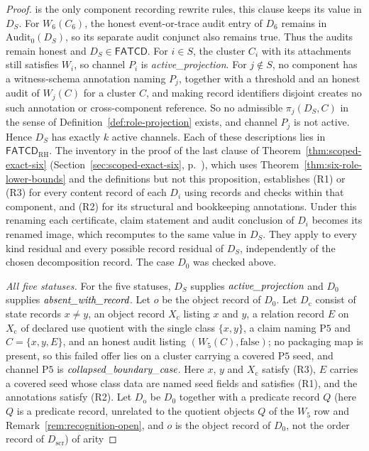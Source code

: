 \documentclass[11pt]{article}
\theoremstyle{definition}
\newcommand{\FATCD}{\ensuremath{\mathsf{FATCD}}}
\newcommand{\activeproj}{\textit{active\_\allowbreak projection}}
\newcommand{\collapsedbc}{\textit{collapsed\_\allowbreak boundary\_\allowbreak case}}
\newcommand{\absentrec}{\textit{absent\_\allowbreak with\_\allowbreak record}}
\newcommand{\Pfive}{\ensuremath{\mathrm{P5}}}
\begin{document}
\begin{proof}
is the only component recording rewrite rules, this clause keeps its value in
\(D_S\). For
\(W_6(C_6)\), the honest event-or-trace audit entry of \(D_6\) remains in
\(\mathrm{Audit}_0(D_S)\), so its separate audit conjunct also remains true.
Thus the audits remain honest and \(D_S\in\FATCD{}\). For \(i\in S\), the cluster \(C_i\)
with its attachments still satisfies \(W_i\), so channel \(P_i\) is
\activeproj{}. For \(j\notin S\), no component has a witness-schema
annotation naming \(P_j\), together with a threshold and an honest audit of
\(W_j(C)\) for a cluster \(C\), and making record identifiers disjoint creates
no such annotation or cross-component reference. So no admissible
\(\pi_j(D_S,C)\) in the sense of Definition~\ref{def:role-projection} exists,
and channel \(P_j\) is not active. Hence \(D_S\) has exactly \(k\) active
channels.
Each of these descriptions lies in \(\FATCD_{\mathrm{RH}}\).
The inventory in the proof of the last clause of
Theorem~\ref{thm:scoped-exact-six} (Section~\ref{sec:scoped-exact-six}, p.~\pageref{thm:scoped-exact-six}), which uses
Theorem~\ref{thm:six-role-lower-bounds} and the definitions but not this
proposition, establishes (R1) or (R3) for every content record of each \(D_i\)
using records and checks within that component, and (R2) for its
structural and bookkeeping annotations. Under this renaming each
certificate, claim statement and audit conclusion of \(D_i\) becomes its renamed
image, which recomputes to the same value in \(D_S\). They apply to every
kind residual and every possible record residual of \(D_S\),
independently of the chosen decomposition record. The case \(D_0\)
was checked above.
\par\emph{All five statuses.} For the five statuses, \(D_S\) supplies \(\activeproj\) and \(D_0\) supplies
\(\absentrec\). Let \(o\) be the object record of \(D_0\). Let \(D_{\mathrm c}\) consist of state
records \(x\ne y\), an object record \(X_{\mathrm c}\) listing \(x\) and \(y\), a
relation record \(E\) on \(X_{\mathrm c}\) of declared use quotient with the
single class \(\{x,y\}\), a claim naming \Pfive{} and \(C=\{x,y,E\}\), and an
honest audit listing \((W_5(C),\mathrm{false})\); no packaging map is present, so
this failed offer lies on a cluster carrying a covered \Pfive{} seed, and channel
\Pfive{} is \(\collapsedbc\). Here \(x\), \(y\) and \(X_{\mathrm c}\) satisfy (R3), \(E\) carries a
covered seed whose class data are named seed fields and satisfies (R1), and the
annotations satisfy (R2). Let \(D_{\mathrm{o}}\) be \(D_0\) together with a predicate record \(Q\) (here \(Q\) is a predicate record, unrelated to the quotient objects \(Q\) of the \(W_5\) row and Remark~\ref{rem:recognition-open}, and \(o\) is the object record of \(D_0\), not the order record of \(D_{\mathrm{scr}}\)) of arity

\end{proof}
\end{document}
